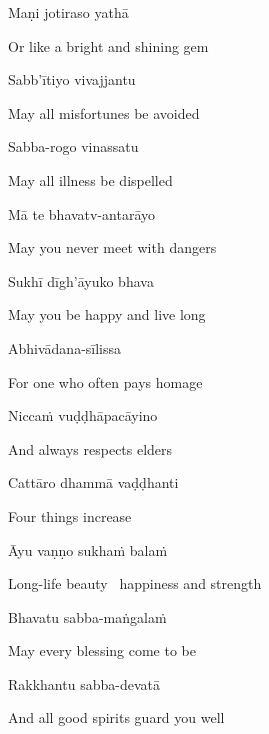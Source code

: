 Maṇi jotiraso yathā

\begin{english}
  Or like a bright and shining gem\\
\end{english}

Sabb'ītiyo vivajjantu

\begin{english}
  May all misfortunes be avoided
\end{english}

Sabba-rogo vinassatu

\begin{english}
  May all illness be dispelled
\end{english}

Mā te bhavatv-antarāyo

\begin{english}
  May you never meet with dangers
\end{english}

Sukhī dīgh'āyuko bhava

\begin{english}
  May you be happy and live long
\end{english}

Abhivādana-sīlissa

\begin{english}
  For one who often pays homage
\end{english}

Niccaṁ vuḍḍhāpacāyino

\begin{english}
  And always respects elders
\end{english}

Cattāro dhammā vaḍḍhanti

\begin{english}
  Four things increase
\end{english}

Āyu vaṇṇo sukhaṁ balaṁ

\begin{english}
  Long-life beauty \breathmark\ happiness and strength
\end{english}

Bhavatu sabba-maṅgalaṁ

\begin{english}
  May every blessing come to be
\end{english}

Rakkhantu sabba-devatā

\begin{english}
  And all good spirits guard you well
\end{english}

